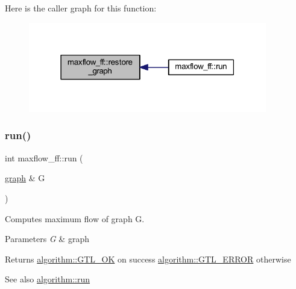 Here is the caller graph for this function\+:\nopagebreak
\begin{figure}[H]
\begin{center}
\leavevmode
\includegraphics[width=295pt]{classmaxflow__ff_a31a13c79918964a49fa18b4eb514c584_icgraph}
\end{center}
\end{figure}
\mbox{\label{classmaxflow__ff_a0a4391b9093d6966b47c023a555099e2}} 
\subsubsection{\texorpdfstring{run()}{run()}}
{\footnotesize\ttfamily int maxflow\+\_\+ff\+::run (\begin{DoxyParamCaption}\item[{\mbox{\hyperlink{classgraph}{graph}} \&}]{G }\end{DoxyParamCaption})\hspace{0.3cm}{\ttfamily [virtual]}}

Computes maximum flow of graph {\ttfamily G}.


\begin{DoxyParams}{Parameters}
{\em G} & graph \\
\hline
\end{DoxyParams}
\begin{DoxyReturn}{Returns}
{\ttfamily \mbox{\hyperlink{classalgorithm_af1a0078e153aa99c24f9bdf0d97f6710a5114c20e4a96a76b5de9f28bf15e282b}{algorithm\+::\+G\+T\+L\+\_\+\+OK}}} on success {\ttfamily \mbox{\hyperlink{classalgorithm_af1a0078e153aa99c24f9bdf0d97f6710a6fcf574690bbd6cf710837a169510dd7}{algorithm\+::\+G\+T\+L\+\_\+\+E\+R\+R\+OR}}} otherwise 
\end{DoxyReturn}
\begin{DoxySeeAlso}{See also}
\mbox{\hyperlink{classalgorithm_a734b189509a8d6b56b65f8ff772d43ca}{algorithm\+::run}} 
\end{DoxySeeAlso}


